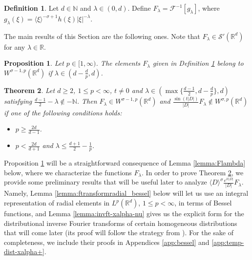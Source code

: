 \documentclass[a4paper, reqno, 11pt]{amsart}
\newtheorem{theorem}{Theorem}[section]
\newtheorem{proposition}[theorem]{Proposition}
\theoremstyle{definition}
\newtheorem{definition}{Definition}[section]
\begin{document}
\begin{definition}\label{def:g-lambda}
Let $d \in \mathbb{N}$ and $\lambda \in (0,d)$. Define $F_{\lambda} = \mathcal{F}^{-1}[g_{\lambda}]$, where $g_{\lambda}(\xi) = \langle \xi \rangle^{-\sigma+1} h(\xi)|\xi|^{-\lambda}$.
\end{definition}
The main results of this Section are the following ones. Note that $F_{\lambda} \in \mathcal{S}'(\mathbb{R}^d)$ for any $\lambda \in \mathbb{R}$.

\begin{proposition}\label{prop:Flambda-inWsigmap}
Let $p\in[1,\infty)$. The elements $F_{\lambda}$ given in Definition \ref{def:g-lambda} belong to $W^{\sigma-1,p}(\mathbb{R}^d)$ if $\lambda \in (d - \frac{d}{p},d)$.
\end{proposition}


\begin{theorem}\label{thm:nonpropag-linear-rn}
Let $d \geq 2$, $1 \leq p < \infty$, $t \neq 0$ and $\lambda \in (\max\{ \frac{d-1}{2} , d - \frac{d}{p}\},d)$ satisfying $\frac{d-1}{2} - \lambda \notin -\mathbb{N}$. Then $F_{\lambda} \in W^{\sigma-1,p}(\mathbb{R}^d)$ and $\frac{\sin(t|D|)}{|D|} F_{\lambda} \notin W^{\sigma,p}(\mathbb{R}^d)$ if one of the following conditions holds:
\begin{itemize}
\item $p \geq \frac{2d}{d-1}$.
\item $p < \frac{2d}{d+1}$ and $\lambda \leq \frac{d+1}{2} - \frac{1}{p}$.  
\end{itemize}
\end{theorem}


Proposition \ref{prop:Flambda-inWsigmap} will be a straightforward consequence of Lemma \ref{lemma:Flambda} below, where we characterize the functions $F_{\lambda}$. In order to prove Theorem \ref{thm:nonpropag-linear-rn}, we provide some preliminary results that will be useful later to analyze $\langle D \rangle^{\sigma} \frac{e^{it|D|}}{|D|} F_{\lambda}$. Namely, Lemma \ref{lemma:ftransformradial_bessel} below will let us use an integral representation of radial elements in $L^p(\mathbb{R}^d)$, $1 \leq p < \infty$, in terms of Bessel functions, and Lemma \ref{lemma:invft-xalpha-nu} gives us the explicit form for the distributional inverse Fourier transforms of certain homogeneous distributions that will come later (its proof will follow the strategy from \cite{GS64}). For the sake of completeness, we include their proofs in Appendices \ref{app:bessel} and \ref{app:temp-dist-xalpha+}. 
\end{document}

